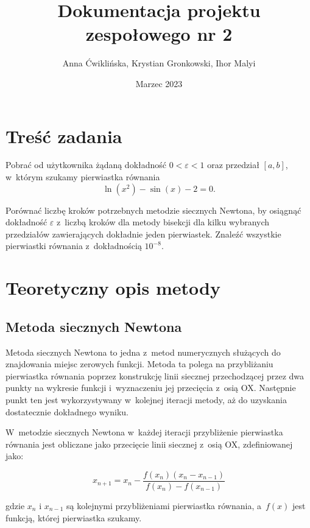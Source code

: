 \documentclass[12pt]{article}
\title{Dokumentacja projektu zespołowego nr 2}
\author{Anna Ćwiklińska, Krystian Gronkowski, Ihor Malyi}
\date{Marzec 2023}
\begin{document}
\lstset{basicstyle=\ttfamily, columns=fullflexible, upquote=true}
\renewcommand{\lstlistingname}{Listing}

\maketitle

\section{Treść zadania}
Pobrać od użytkownika żądaną dokładność $0<\varepsilon<1$ oraz przedział $[a,b]$, w~którym szukamy pierwiastka równania $$\ln(x^2) - \sin(x) - 2 = 0.$$

Porównać liczbę kroków potrzebnych metodzie siecznych Newtona, by osiągnąć dokładność $\varepsilon$ z~liczbą kroków dla metody bisekcji dla kilku wybranych przedziałów zawierających dokładnie jeden pierwiastek. Znaleźć wszystkie pierwiastki równania z~dokładnością $10^{-8}$.

\section{Teoretyczny opis metody}


\subsection{Metoda siecznych Newtona}
Metoda siecznych Newtona to jedna z~metod numerycznych służących do znajdowania miejsc zerowych funkcji. Metoda ta polega na przybliżaniu pierwiastka równania poprzez konstrukcję linii siecznej przechodzącej przez dwa punkty na wykresie funkcji i~wyznaczeniu jej przecięcia z~osią OX. Następnie punkt ten jest wykorzystywany w~kolejnej iteracji metody, aż do uzyskania dostatecznie dokładnego wyniku.

W~metodzie siecznych Newtona w~każdej iteracji przybliżenie pierwiastka równania jest obliczane jako przecięcie linii siecznej z~osią OX, zdefiniowanej jako:

$$x_{n+1} = x_n - \frac{f(x_n)(x_n-x_{n-1})}{f(x_n)-f(x_{n-1})}$$

gdzie $x_n$ i $x_{n-1}$ są kolejnymi przybliżeniami pierwiastka równania, a~$f(x)$ jest funkcją, której pierwiastka szukamy.
\end{document}
